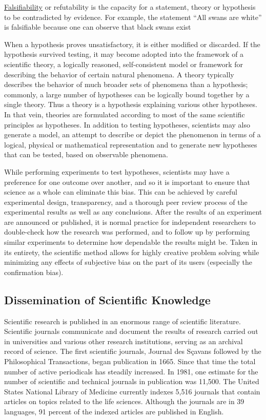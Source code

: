 \href{https://en.wikipedia.org/wiki/Falsifiability}{Falsifiability} or refutability is the capacity for a statement, theory or hypothesis to be contradicted by evidence. For example, the statement ``All swans are white'' is falsifiable because one can observe that black swans exist

When a hypothesis proves unsatisfactory, it is either modified or discarded. If the hypothesis survived testing, it may become adopted into the framework of a scientific theory, a logically reasoned, self-consistent model or framework for describing the behavior of certain natural phenomena. A theory typically describes the behavior of much broader sets of phenomena than a hypothesis; commonly, a large number of hypotheses can be logically bound together by a single theory. Thus a theory is a hypothesis explaining various other hypotheses. In that vein, theories are formulated according to most of the same scientific principles as hypotheses. In addition to testing hypotheses, scientists may also generate a model, an attempt to describe or depict the phenomenon in terms of a logical, physical or mathematical representation and to generate new hypotheses that can be tested, based on observable phenomena.

While performing experiments to test hypotheses, scientists may have a preference for one outcome over another, and so it is important to ensure that science as a whole can eliminate this bias. This can be achieved by careful experimental design, transparency, and a thorough peer review process of the experimental results as well as any conclusions. After the results of an experiment are announced or published, it is normal practice for independent researchers to double-check how the research was performed, and to follow up by performing similar experiments to determine how dependable the results might be. Taken in its entirety, the scientific method allows for highly creative problem solving while minimizing any effects of subjective bias on the part of its users (especially the confirmation bias).

\hypertarget{dissemination-of-scientific-knowledge}{%
\subsection{Dissemination of Scientific Knowledge}\label{dissemination-of-scientific-knowledge}}

Scientific research is published in an enormous range of scientific literature. Scientific journals communicate and document the results of research carried out in universities and various other research institutions, serving as an archival record of science. The first scientific journals, Journal des Sçavans followed by the Philosophical Transactions, began publication in 1665. Since that time the total number of active periodicals has steadily increased. In 1981, one estimate for the number of scientific and technical journals in publication was 11,500. The United States National Library of Medicine currently indexes 5,516 journals that contain articles on topics related to the life sciences. Although the journals are in 39 languages, 91 percent of the indexed articles are published in English.

